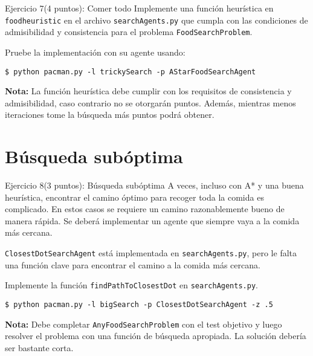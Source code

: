 \documentclass[10pt]{beamer}
\newcommand{\themename}{\textbf{\textsc{metropolis}}\xspace}
\begin{document}
\begin{frame}[fragile]{Ejercicio 7(4 puntos): Comer todo}
Implemente una función heurística en \texttt{foodheuristic} en el 
archivo \texttt{searchAgents.py} que cumpla con las condiciones de 
admisibilidad y consistencia para el problema \texttt{FoodSearchProblem}.

Pruebe la implementación con su agente usando:

\begin{lstlisting}
$ python pacman.py -l trickySearch -p AStarFoodSearchAgent
\end{lstlisting}

\textbf{Nota:} La función heurística debe cumplir con los requisitos 
de consistencia y admisibilidad, caso contrario no se otorgarán puntos. Además,
mientras menos iteraciones tome la búsqueda más puntos podrá obtener.

\end{frame}

\section{Búsqueda subóptima}

\begin{frame}[fragile]{Ejercicio 8(3 puntos): Búsqueda subóptima}
A veces, incluso con A* y una buena heurística, encontrar el camino 
óptimo para recoger toda la comida es complicado. En estos casos se 
requiere un camino razonablemente bueno de manera rápida. Se deberá implementar 
un agente que siempre vaya a la comida más cercana.

\texttt{ClosestDotSearchAgent} está implementada en \texttt{searchAgents.py}, pero 
le falta una función clave para encontrar el camino a la comida más cercana.

Implemente la función \texttt{findPathToClosestDot} en \texttt{searchAgents.py}. 

\begin{lstlisting}
$ python pacman.py -l bigSearch -p ClosestDotSearchAgent -z .5
\end{lstlisting}

\textbf{Nota:} Debe completar \texttt{AnyFoodSearchProblem} con el 
test objetivo y luego resolver el problema con una función de búsqueda apropiada. 
La solución debería ser bastante corta.

\end{frame}

\appendix



\end{document}
